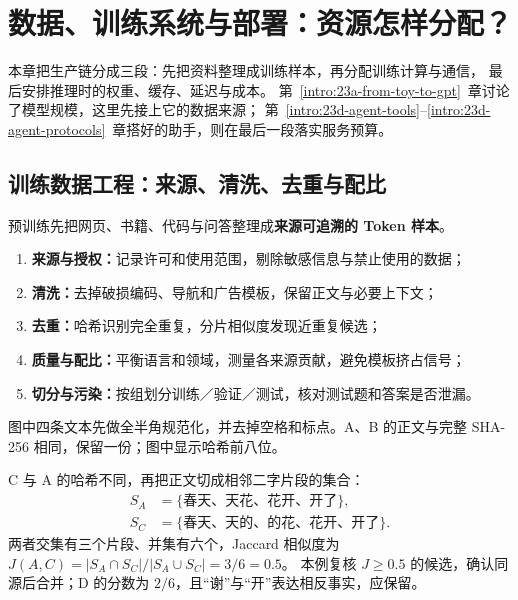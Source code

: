 \chapterrule
\section{数据、训练系统与部署：资源怎样分配？}
\label{intro:23b-deployment-and-ecosystem}



本章把生产链分成三段：先把资料整理成训练样本，再分配训练计算与通信，
最后安排推理时的权重、缓存、延迟与成本。
第~\ref*{intro:23a-from-toy-to-gpt}~章讨论了模型规模，这里先接上它的数据来源；
第~\ref*{intro:23d-agent-tools}--\ref*{intro:23d-agent-protocols}~章搭好的助手，则在最后一段落实服务预算。

\subsection{训练数据工程：来源、清洗、去重与配比}
\label{sec:data-engineering}
\label{concept:pretraining-data}
\label{concept:evaluation-contamination}
预训练先把网页、书籍、代码与问答整理成\textbf{来源可追溯的 Token 样本}。

\begin{enumerate}[itemsep=0pt,parsep=0pt,topsep=2pt]
\item \textbf{来源与授权：}记录许可和使用范围，剔除敏感信息与禁止使用的数据；
\item \textbf{清洗：}去掉破损编码、导航和广告模板，保留正文与必要上下文；
\item \textbf{去重：}哈希识别完全重复，分片相似度发现近重复候选；
\item \textbf{质量与配比：}平衡语言和领域，测量各来源贡献，避免模板挤占信号；
\item \textbf{切分与污染：}按组划分训练／验证／测试，核对测试题和答案是否泄漏。
\end{enumerate}

图中四条文本先做全半角规范化，并去掉空格和标点。A、B 的正文与完整 SHA-256 相同，保留一份；图中显示哈希前八位。

\par\Needspace{75mm}


C 与 A 的哈希不同，再把正文切成相邻二字片段的集合：
\[
\begin{aligned}
S_A&=\{\text{春天、天花、花开、开了}\},\\
S_C&=\{\text{春天、天的、的花、花开、开了}\}.
\end{aligned}
\]
两者交集有三个片段、并集有六个，Jaccard 相似度为
$J(A,C)=|S_A\cap S_C|/|S_A\cup S_C|=3/6=0.5$。
本例复核 $J\ge0.5$ 的候选，确认同源后合并；D 的分数为 $2/6$，且“谢”与“开”表达相反事实，应保留。

